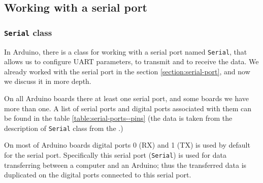 \documentclass[../sparc.tex]{subfiles}
\begin{document}

\subsection{Working with a serial port}

\subsubsection{\texttt{Serial} class}

In Arduino, there is a class for working with a serial port named
\texttt{Serial}, that allows us to configure \gls{UART} parameters, to transmit
and to receive the data.  We already worked with the serial port in the section
\ref{section:serial-port}, and now we discuss it in more depth.

On all Arduino boards there at least one serial port, and some boards we have
more than one.  A list of serial ports and digital ports associated with them
can be found in the table \ref{table:serial-ports--pins} (the data is taken from
the description of \texttt{Serial} class from the \cite{arduino:reference}.)


On most of Arduino boards digital ports 0 (RX) and 1 (TX) is used by default for
the serial port.  Specifically this serial port (\texttt{Serial}) is used for
data transferring between a computer and an Arduino; thus the transferred data
is duplicated on the digital ports connected to this serial port.
\end{document}
